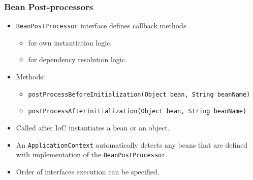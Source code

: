 \documentclass[10pt,xcolor=pdflatex, table]{beamer}
\begin{document}
\begin{frame}\frametitle{Bean Post-processors}
	\begin{itemize}
		\item \texttt{BeanPostProcessor} interface defines callback methods
          \begin{itemize}
        	\item for own instantiation logic,	
        	\item for dependency resolution logic.
          \end{itemize}
        \item Methods:
          \begin{itemize}
              \item \texttt{postProcessBeforeInitialization(Object bean, String beanName)}
              \item \texttt{postProcessAfterInitialization(Object bean, String beanName)}
          \end{itemize}
		\item Called after IoC instantiates a bean or an object.
		\item An \texttt{ApplicationContext} automatically detects any beans that are defined with implementation of the \texttt{BeanPostProcessor}.
		\item Order of interfaces execution can be specified.
	\end{itemize}
\end{frame}
\end{document}
